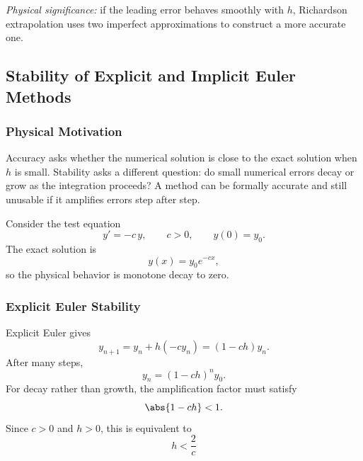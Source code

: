 \textit{Physical significance:} if the leading error behaves smoothly with
$h$, Richardson extrapolation uses two imperfect approximations to construct
a more accurate one.

\subsection{Stability of Explicit and Implicit Euler Methods}
\label{subsec:lec06:stability}

\subsubsection*{Physical Motivation}
Accuracy asks whether the numerical solution is close to the exact solution
when $h$ is small. Stability asks a different question: do small numerical
errors decay or grow as the integration proceeds? A method can be formally
accurate and still unusable if it amplifies errors step after step.

Consider the test equation
\begin{equation}
    y'=-c\,y,
    \qquad c>0,
    \qquad y(0)=y_0.
    \label{eq:lec06:decay-equation}
\end{equation}
The exact solution is
\begin{equation}
    y(x)=y_0 e^{-cx},
    \label{eq:lec06:decay-exact}
\end{equation}
so the physical behavior is monotone decay to zero.

\subsubsection{Explicit Euler Stability}
Explicit Euler gives
\begin{equation}
    y_{n+1}
    =y_n+h(-c y_n)
    =(1-ch)y_n.
    \label{eq:lec06:explicit-euler-decay}
\end{equation}
After many steps,
\begin{equation}
    y_n=(1-ch)^n y_0.
    \label{eq:lec06:explicit-euler-many}
\end{equation}
For decay rather than growth, the amplification factor must satisfy
\begin{equation}
    \abs{1-ch}<1.
    \label{eq:lec06:explicit-stability-ineq}
\end{equation}
Since $c>0$ and $h>0$, this is equivalent to
\begin{equation}
    \boxed{
    h<\frac{2}{c}}
    \label{eq:lec06:explicit-stability-condition}
\end{equation}

